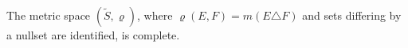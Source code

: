 The metric space $(\tilde{S}, \varrho)$, where $\varrho(E, F) = m(E \triangle F)$ and sets differing by a nullset are identified, is complete.
